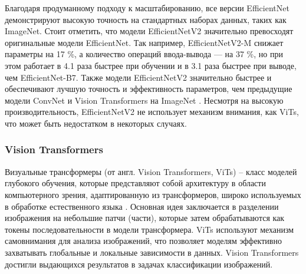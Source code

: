 \documentclass[a4paper,12pt]{extarticle}
\begin{document}
Благодаря продуманному подходу к масштабированию, все версии EfficientNet демонстрируют высокую точность на стандартных наборах данных, таких как ImageNet. Стоит отметить, что модели EfficientNetV2 значительно превосходят оригинальные модели EfficientNet. Так например, EfficientNetV2-M снижает параметры на 17 \%, а количество операций ввода-вывода — на 37 
\%, но при этом работает в 4.1 раза быстрее при обучении и в 3.1 раза быстрее при выводе, чем EfficientNet-B7. Также модели EfficientNetV2 значительно быстрее и обеспечивают лучшую точность и эффективность параметров, чем предыдущие модели ConvNet и Vision Transformers на ImageNet \cite{efficientnetv2}. Несмотря на высокую производительность, EfficientNetV2 не использует механизм внимания, как ViTs, что может быть недостатком в некоторых случаях. 

\subsubsection{Vision Transformers}

Визуальные трансформеры (от англ. Vision Transformers, ViTs) – класс моделей глубокого обучения, которые представляют собой архитектуру в области компьютерного зрения, адаптированную из трансформеров, широко используемых в обработке естественного языка \cite{vit}. Основная идея заключается в разделении изображения на небольшие патчи (части), которые затем обрабатываются как токены последовательности в модели трансформера. ViTs используют механизм самовнимания для анализа изображений, что позволяет моделям эффективно захватывать глобальные и локальные зависимости в данных. Vision Transformers достигли выдающихся результатов в задачах классификации изображений.
\end{document}

